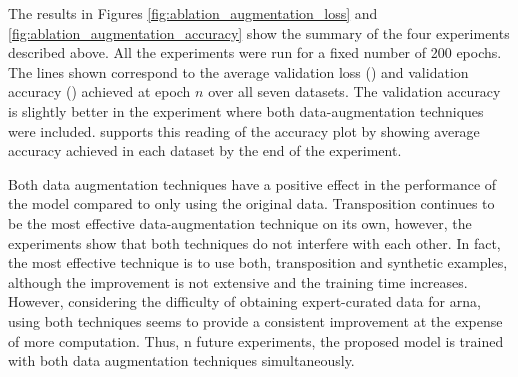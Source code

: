 
The results in Figures \ref{fig:ablation_augmentation_loss}
and \ref{fig:ablation_augmentation_accuracy} show the
summary of the four experiments described above. All the
experiments were run for a fixed number of 200 epochs. The
lines shown correspond to the average validation loss
() and validation
accuracy () achieved
at epoch $n$ over all seven datasets. The validation
accuracy is slightly better in the experiment where both
data-augmentation techniques were included.
 supports this reading of the
accuracy plot by showing average accuracy achieved in each
dataset by the end of the experiment.




Both data augmentation techniques have a positive effect in
the performance of the model compared to only using the
original data. Transposition continues to be the most
effective data-augmentation technique on its own, however,
the experiments show that both techniques do not interfere
with each other. In fact, the most effective technique is to
use both, transposition and synthetic examples, although the
improvement is not extensive and the training time
increases. However, considering the difficulty of obtaining
expert-curated data for \gls{arna}, using both techniques
seems to provide a consistent improvement at the expense of
more computation. Thus, n future experiments, the proposed
model is trained with both data augmentation techniques
simultaneously.

